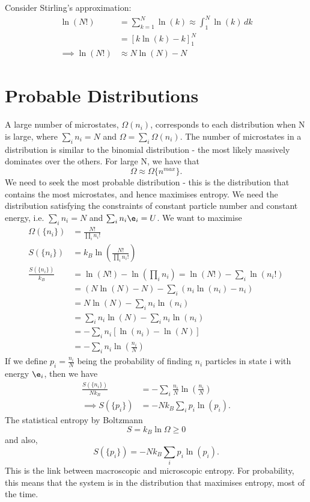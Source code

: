 \documentclass[a4paper, 11pt, normalem]{report}
\begin{document}
Consider Stirling's approximation:
\begin{align}
    \ln(N!) &= \sum_{k=1}^N \ln(k) \approx \int_1^N \ln(k)\,dk \\
            &= [k\ln(k) - k]_1^N \\
    \implies \ln(N!) &\approx N\ln(N) - N
\end{align}

\section{Probable Distributions}
A large number of microstates, $\Omega(n_i)$, corresponds to each distribution when N is large, where $\sum_i n_i = N$ and $\Omega = \sum_i \Omega(n_i)$.
The number of microstates in a distribution is similar to the binomial distribution - the most likely massively dominates over the others.
For large N, we have that
\begin{equation}
    \Omega \approx \Omega\{n^{max}\}.
\end{equation}
We need to seek the most probable distribution - this is the distribution that contains the most microstates, and hence maximises entropy.
We need the distribution satisfying the constraints of constant particle number and constant energy, i.e. $\sum_i n_i = N$ and $\sum_i n_i\e_i = U$.
We want to maximise
\begin{align}
    \Omega(\{n_i\}) &= \frac{N!}{\prod_i n_i!} \\
    S(\{n_i\}) &= k_B\ln\left(\frac{N!}{\prod_i n_i!}\right) \\
    \frac{S(\{n_i\})}{k_B} &= \ln(N!) - \ln\left(\prod_i n_i\right) = \ln(N!) - \sum_i \ln(n_i!) \\
                           &= (N\ln(N) - N) - \sum_i (n_i\ln(n_i) - n_i) \\
                           &= N\ln(N) - \sum_i n_i\ln(n_i) \\
                           &= \sum_i n_i\ln(N) - \sum_i n_i\ln(n_i) \\
                           &= -\sum_i n_i\left[\ln(n_i) - \ln(N)\right] \\
                           &= -\sum_i n_i\ln\left(\frac{n_i}{N}\right)
\end{align}
If we define $p_i = \frac{n_i}{N}$ being the probability of finding $n_i$ particles in state i with energy $\e_i$, then we have
\begin{align}
    \frac{S(\{n_i\})}{Nk_B} &= -\sum_i \frac{n_i}{N}\ln\left(\frac{n_i}{N}\right) \\
    \implies S(\{p_i\}) &= -Nk_B\sum_i p_i\ln(p_i).
\end{align}
The statistical entropy by Boltzmann
\begin{equation}
    S = k_B\ln\Omega \geq 0
\end{equation}
and also,
\begin{equation}
    S(\{p_i\}) = -Nk_B\sum_i p_i\ln(p_i).
\end{equation}
This is the link between macroscopic and microscopic entropy.
For probability, this means that the system is in the distribution that maximises entropy, most of the time.
\end{document}
